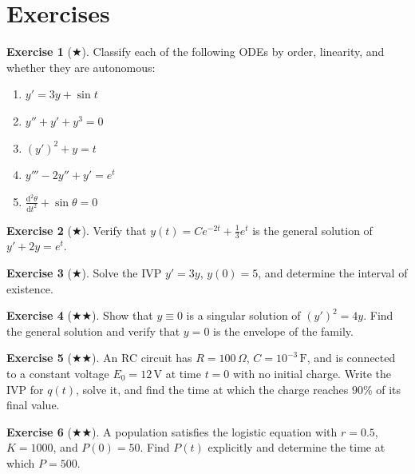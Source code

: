 \documentclass[12pt,a4paper,openany]{book}
\theoremstyle{definition}
\newtheorem{exercise}{Exercise}[chapter]
\theoremstyle{plain}
\theoremstyle{remark}
\newcommand{\dd}{\mathrm{d}}
\begin{document}
\section{Exercises}
\label{sec:exercises-ch1}

\begin{exercise}[$\bigstar$]
\label{exer:ch1-classify}
Classify each of the following ODEs by order, linearity, and whether they are autonomous:
\begin{enumerate}[label=(\alph*)]
  \item $y' = 3y + \sin t$
  \item $y'' + y' + y^3 = 0$
  \item $(y')^2 + y = t$
  \item $y''' - 2y'' + y' = e^t$
  \item $\displaystyle\frac{\dd^2 \theta}{\dd t^2} + \sin\theta = 0$
\end{enumerate}
\end{exercise}

\begin{exercise}[$\bigstar$]
\label{exer:ch1-verify}
Verify that $y(t)=Ce^{-2t}+\frac{1}{3}e^{t}$ is the general solution of $y'+2y=e^{t}$.
\end{exercise}

\begin{exercise}[$\bigstar$]
\label{exer:ch1-ivp-solve}
Solve the IVP $y' = 3y$, $y(0) = 5$, and determine the interval of existence.
\end{exercise}

\begin{exercise}[$\bigstar\bigstar$]
\label{exer:ch1-singular}
Show that $y \equiv 0$ is a singular solution of $(y')^2 = 4y$. Find the general solution and verify that $y = 0$ is the envelope of the family.
\end{exercise}

\begin{exercise}[$\bigstar\bigstar$]
\label{exer:ch1-rc}
An RC circuit has $R = 100\,\Omega$, $C = 10^{-3}\,\text{F}$, and is connected to a constant voltage $E_0 = 12\,\text{V}$ at time $t=0$ with no initial charge. Write the IVP for $q(t)$, solve it, and find the time at which the charge reaches $90\%$ of its final value.
\end{exercise}

\begin{exercise}[$\bigstar\bigstar$]
\label{exer:ch1-logistic}
A population satisfies the logistic equation with $r = 0.5$, $K = 1000$, and $P(0) = 50$. Find $P(t)$ explicitly and determine the time at which $P = 500$.
\end{exercise}
\end{document}
